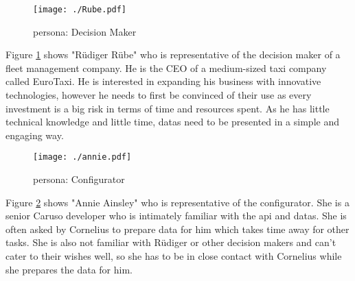 \begin{figure}[ht]
  \centering
  \texttt{[image: ./Rube.pdf]}
  \caption{\Gls{persona}: Decision Maker}
  \label{Persona:Rube}
\end{figure}
Figure \ref{Persona:Rube} shows "Rüdiger Rübe" who is representative of the decision maker of a fleet management company. He is the CEO of a medium-sized taxi company called EuroTaxi. He is interested in expanding his business with innovative technologies, however he needs to first be convinced of their use as every investment is a big risk in terms of time and resources spent. As he  has little technical knowledge and little time, \glspl{data} need to be presented in a simple and engaging way. 

\begin{figure}[ht]
  \centering
  \texttt{[image: ./annie.pdf]}
  \caption{\Gls{persona}: Configurator}
  \label{Persona:Annie}
\end{figure}
Figure \ref{Persona:Annie} shows "Annie Ainsley" who is representative of the configurator. She is a senior Caruso developer who is intimately familiar with the \gls{api} and \glspl{data}. She is often asked by Cornelius to prepare data for him which takes time away for other tasks. She is also not familiar with Rüdiger or other decision makers and can't cater to their wishes well, so she has to be in close contact with Cornelius while she prepares the data for him.
